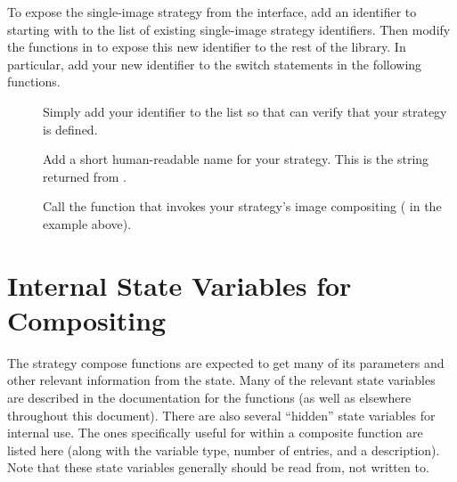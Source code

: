 To expose the single-image strategy from the \IceT interface, add an
identifier to  starting with
 to the list of existing
single-image strategy identifiers.  Then modify the functions in
 to expose this new identifier to the rest
of the \IceT library.  In particular, add your new identifier to the switch
statements in the following functions.

\begin{description}
\item[] Simply add your
  identifier to the list so that \IceT can verify that your strategy is
  defined.
\item[] Add a short
  human-readable name for your strategy.  This is the string returned from
  .
\item[] Call the function that
  invokes your strategy's image compositing
  ( in the example above).
\end{description}

\section{Internal State Variables for Compositing}

The strategy compose functions are expected to get many of its parameters
and other relevant information from the \IceT state.  Many of the relevant
state variables are described in the documentation for the 
functions (as well as elsewhere throughout this document).  There are also
several ``hidden'' state variables for internal use.  The ones specifically
useful for within a composite function are listed here (along with the
variable type, number of entries, and a description).  Note that these
state variables generally should be read from, not written to.

